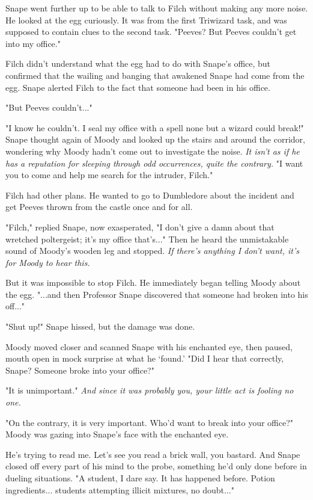 \documentclass[a4paper,11pt]{article}
\begin{document}
Snape went further up to be able to talk to Filch without making any more noise. He looked at the egg curiously. It was from the first Triwizard task, and was supposed to contain clues to the second task. "Peeves? But Peeves couldn't get into my office."

Filch didn't understand what the egg had to do with Snape's office, but confirmed that the wailing and banging that awakened Snape had come from the egg. Snape alerted Filch to the fact that someone had been in his office.

"But Peeves couldn't..."

"I know he couldn't. I seal my office with a spell none but a wizard could break!" Snape thought again of Moody and looked up the stairs and around the corridor, wondering why Moody hadn't come out to investigate the noise. \emph{It isn't as if he has a reputation for sleeping through odd occurrences, quite the contrary.} "I want you to come and help me search for the intruder, Filch."

Filch had other plans. He wanted to go to Dumbledore about the incident and get Peeves thrown from the castle once and for all.

"Filch," replied Snape, now exasperated, "I don't give a damn about that wretched poltergeist; it's my office that's..." Then he heard the unmistakable sound of Moody's wooden leg and stopped. \emph{If there's anything I don't want, it's for Moody to hear this.}

But it was impossible to stop Filch. He immediately began telling Moody about the egg. "...and then Professor Snape discovered that someone had broken into his off..."

"Shut up!" Snape hissed, but the damage was done.

Moody moved closer and scanned Snape with his enchanted eye, then paused, mouth open in mock surprise at what he `found.' "Did I hear that correctly, Snape? Someone broke into your office?"

"It is unimportant." \emph{And since it was probably you, your little act is fooling no one.}

"On the contrary, it is very important. Who'd want to break into your office?" Moody was gazing into Snape's face with the enchanted eye.

He's trying to read me. Let's see you read a brick wall, you bastard. And Snape closed off every part of his mind to the probe, something he'd only done before in dueling situations. "A student, I dare say. It has happened before. Potion ingredients... students attempting illicit mixtures, no doubt..."
\end{document}
